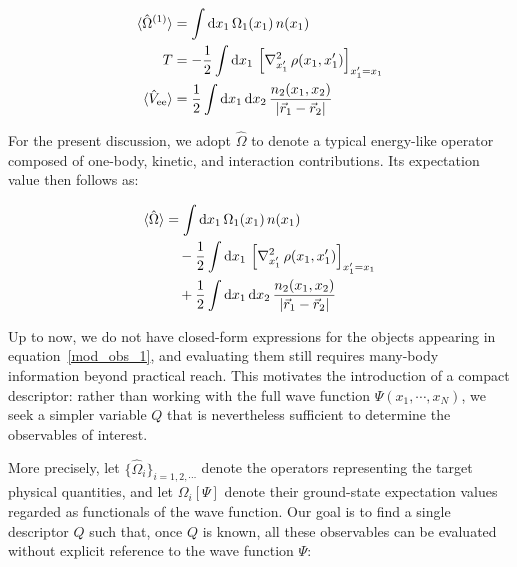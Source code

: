 \begin{equation}
\begin{aligned}
    \braket{\hat{\Omega}^{(1)}} &= \int \mathrm{d}x_1\,\Omega_1(x_1)\,n(x_1)\\
    T &= -\frac{1}{2}\int \mathrm{d}x_1\,
    \left[\nabla_{x'_1}^{2}\,\rho(x_1,x'_1)\right]_{x'_1=x_1}\\
    \braket{\hat{V}_\mathrm{ee}} &= \frac{1}{2}\int \mathrm{d}x_1\,\mathrm{d}x_2\,
    \frac{n_2(x_1,x_2)}{|\vec{r}_1-\vec{r}_2|}
\end{aligned}
\label{one-body_operator_with_kernel}
\end{equation}

For the present discussion, we adopt $\hat{\Omega}$ to denote a typical energy-like operator composed of one-body, kinetic, and interaction contributions.
Its expectation value then follows as:

\begin{equation}
\begin{aligned}
    \braket{\hat{\Omega}} %
    &= \int \mathrm{d}x_1\, \Omega_1(x_1)\, n(x_1) \\
    &\quad - \frac{1}{2}\int \mathrm{d}x_1\,
    \left[\nabla_{x'_1}^{2}\,\rho(x_1,x'_1)\right]_{x'_1=x_1} \\
    &\quad + \frac{1}{2}\int \mathrm{d}x_1\,\mathrm{d}x_2\,
    \frac{n_2(x_1,x_2)}{|\vec{r}_1-\vec{r}_2|}
\end{aligned}
\label{mod_obs_1}
\end{equation}


Up to now, we do not have closed-form expressions for the objects appearing in equation~\eqref{mod_obs_1}, and evaluating them still requires many-body information beyond practical reach.
This motivates the introduction of a compact descriptor: rather than working with the full wave function $\Psi(x_1,\cdots,x_N)$, we seek a simpler variable $Q$ that is nevertheless sufficient to determine the observables of interest.

More precisely, let $\{\hat{\Omega}_i\}_{i=1,2,\cdots}$ denote the operators representing the target physical quantities, and let $\Omega_i[\Psi]$ denote their ground-state expectation values regarded as functionals of the wave function.
Our goal is to find a single descriptor $Q$ such that, once $Q$ is known, all these observables can be evaluated without explicit reference to the wave function $\Psi$:

